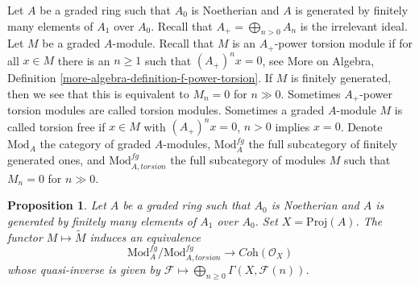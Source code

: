 \documentclass{stacks-project}
\theoremstyle{plain}
\newtheorem{proposition}[subsection]{Proposition}
\theoremstyle{definition}
\theoremstyle{remark}
\numberwithin{equation}{subsection}
\begin{document}
\noindent
Let $A$ be a graded ring such that $A_0$ is Noetherian and $A$ is generated
by finitely many elements of $A_1$ over $A_0$. Recall that
$A_+ = \bigoplus_{n > 0} A_n$ is the irrelevant ideal.
Let $M$ be a graded $A$-module. Recall that
$M$ is an $A_+$-power torsion module if for all $x \in M$
there is an $n \geq 1$ such that $(A_+)^n x = 0$, see
More on Algebra, Definition \ref{more-algebra-definition-f-power-torsion}.
If $M$ is finitely generated, then we see that
this is equivalent to $M_n = 0$ for $n \gg 0$.
Sometimes $A_+$-power torsion modules are called torsion modules.
Sometimes a graded $A$-module $M$ is called torsion free if
$x \in M$ with $(A_+)^n x = 0$, $n > 0$ implies $x = 0$.
Denote $\text{Mod}_A$ the category of graded $A$-modules,
$\text{Mod}^{fg}_A$ the full subcategory of finitely generated ones,
and $\text{Mod}^{fg}_{A, torsion}$ the full subcategory of
modules $M$ such that $M_n = 0$ for $n \gg 0$.

\begin{proposition}
\label{proposition-coherent-modules-on-proj}
Let $A$ be a graded ring such that $A_0$ is Noetherian and $A$ is generated
by finitely many elements of $A_1$ over $A_0$.
Set $X = \text{Proj}(A)$. The functor $M \mapsto \widetilde M$
induces an equivalence
$$
\text{Mod}^{fg}_A/\text{Mod}^{fg}_{A, torsion}
\longrightarrow
\textit{Coh}(\mathcal{O}_X)
$$
whose quasi-inverse is given by
$\mathcal{F} \longmapsto \bigoplus_{n \geq 0} \Gamma(X, \mathcal{F}(n))$.
\end{proposition}
\end{document}
